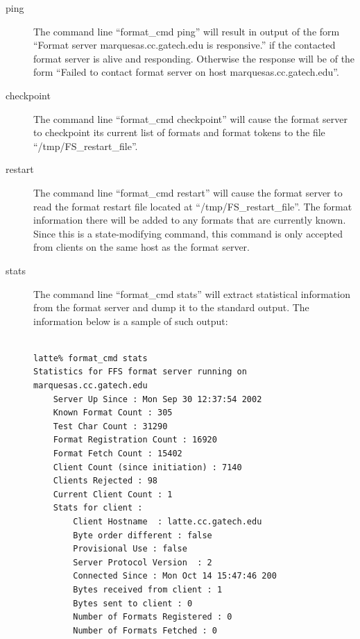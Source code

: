 \documentclass{article}
\begin{document}
\begin{description}
\item[ping] The command line ``format\_cmd ping'' will result in output of
the form ``Format server marquesas.cc.gatech.edu is responsive.'' if the
contacted format server is alive and responding.  Otherwise the response
will be of the form ``Failed to contact format server on host
marquesas.cc.gatech.edu''.
\item[checkpoint] The command line ``format\_cmd checkpoint'' will cause the
format server to checkpoint its current list of formats and format tokens to
the file ``/tmp/FS\_restart\_file''.
\item[restart] The command line ``format\_cmd restart'' will cause the
format server to read the format restart file located at ``/tmp/FS\_restart\_file''.  The format
information there will be added to any formats that are currently known.
Since this is a state-modifying command, this command is only accepted from
clients on the same host as the format server.
\item[stats] The command line ``format\_cmd stats'' will extract statistical
information from the format server and dump it to the standard output.  The
information below is a sample of such output:
\begin{verbatim}

latte% format_cmd stats
Statistics for FFS format server running on marquesas.cc.gatech.edu 
    Server Up Since : Mon Sep 30 12:37:54 2002 
    Known Format Count : 305 
    Test Char Count : 31290 
    Format Registration Count : 16920 
    Format Fetch Count : 15402 
    Client Count (since initiation) : 7140 
    Clients Rejected : 98 
    Current Client Count : 1 
    Stats for client : 
        Client Hostname  : latte.cc.gatech.edu 
        Byte order different : false 
        Provisional Use : false 
        Server Protocol Version  : 2 
        Connected Since : Mon Oct 14 15:47:46 200 
        Bytes received from client : 1 
        Bytes sent to client : 0 
        Number of Formats Registered : 0 
        Number of Formats Fetched : 0 
\end{verbatim}
\end{description}
\end{document}
